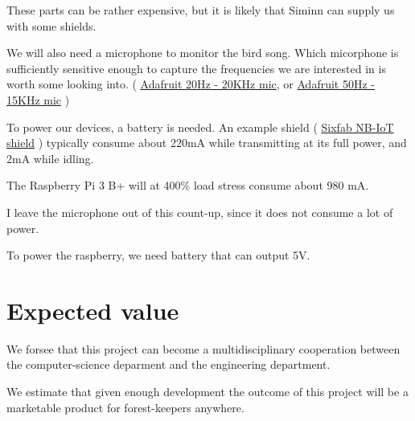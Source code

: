     These parts can be rather expensive, but it is 
    likely that Siminn can supply us with some shields. 

    We will also need a microphone to monitor the bird song.
    Which micorphone is sufficiently sensitive enough
    to capture the frequencies we are interested in is
    worth some looking into. 
    (
        \href{https://www.adafruit.com/product/1064}{Adafruit 20Hz - 20KHz mic}, 
        or
        \href{https://www.adafruit.com/product/3421}{Adafruit 50Hz - 15KHz mic}
    )

    To power our devices, a battery is needed.
    An example shield 
    (
        \href{https://sixfab.com/product/raspberry-pi-nb-iot-shield/}{Sixfab NB-IoT shield}
    ) 
    typically consume about 220mA while transmitting 
    at its full power, and 2mA while idling.

    The Raspberry Pi 3 B+ will at 400\% load stress consume 
    about 980 mA.

    I leave the microphone out of this count-up, since it does
    not consume a lot of power. 

    To power the raspberry, we need battery that can 
    output 5V.

    

\section{Expected value}
    We forsee that this project can become a multidisciplinary
    cooperation between the computer-science deparment and the 
    engineering department. %

    We estimate that given enough development the outcome of 
    this project will be a marketable product for forest-keepers
    anywhere.